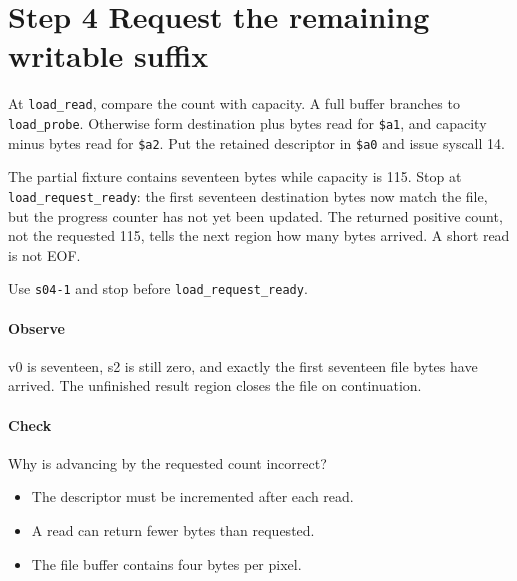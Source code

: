 \section{Step 4 Request the remaining writable suffix}\label{png-load-s04}
At \texttt{load\_read}, compare the count with capacity. A full buffer branches to \texttt{load\_probe}. Otherwise form destination plus bytes read for \texttt{\$a1}, and capacity minus bytes read for \texttt{\$a2}. Put the retained descriptor in \texttt{\$a0} and issue syscall 14.

The partial fixture contains seventeen bytes while capacity is 115. Stop at \texttt{load\_request\_ready}: the first seventeen destination bytes now match the file, but the progress counter has not yet been updated. The returned positive count, not the requested 115, tells the next region how many bytes arrived. A short read is not EOF.

Use \texttt{s04-1} and stop before \texttt{load\_request\_ready}.

\paragraph{Observe} v0 is seventeen, s2 is still zero, and exactly the first seventeen file bytes have arrived. The unfinished result region closes the file on continuation.

\paragraph{Check} Why is advancing by the requested count incorrect?
\begin{itemize}
  \item[A.] The descriptor must be incremented after each read.
  \item[B.] A read can return fewer bytes than requested.
  \item[C.] The file buffer contains four bytes per pixel.
\end{itemize}
